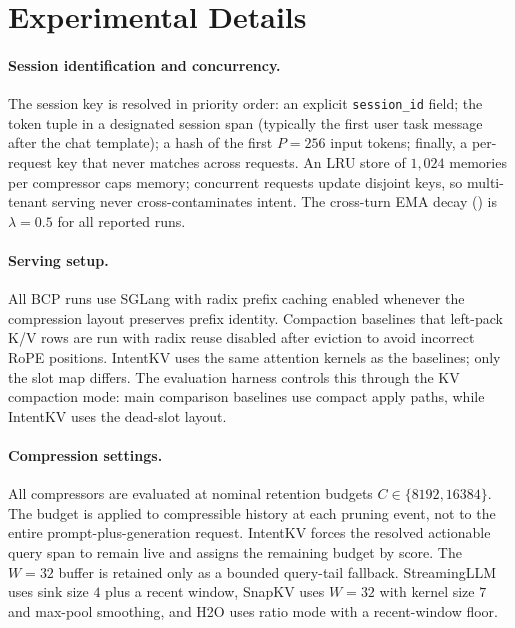 \documentclass[11pt]{article}
\newcommand{\method}{IntentKV\xspace}
\begin{document}


\appendix

\section{Experimental Details}
\label{appendix:hyperparams}

\paragraph{Session identification and concurrency.}
The session key is resolved in priority order: an explicit
\texttt{session\_id} field; the token tuple in a designated session
span (typically the first user task message after the chat
template); a hash of the first $P\!=\!256$ input tokens; finally, a
per-request key that never matches across requests. An LRU store of
$1{,}024$ memories per compressor caps memory; concurrent requests
update disjoint keys, so multi-tenant serving never
cross-contaminates intent. The cross-turn EMA decay
() is $\lambda{=}0.5$ for all reported runs.

\paragraph{Serving setup.}
All BCP runs use SGLang with radix prefix caching enabled whenever the
compression layout preserves prefix identity. Compaction baselines that
left-pack K/V rows are run with radix reuse disabled after eviction to
avoid incorrect RoPE positions. \method uses the same attention kernels
as the baselines; only the slot map differs. The evaluation harness
controls this through the KV compaction mode: main comparison baselines
use compact apply paths, while \method uses the dead-slot layout.

\paragraph{Compression settings.}
All compressors are evaluated at nominal retention budgets
$C\in\{8192,16384\}$. The budget is applied to compressible history at
each pruning event, not to the entire prompt-plus-generation request.
\method forces the resolved actionable query span to remain live and
assigns the remaining budget by score. The $W{=}32$ buffer is retained
only as a bounded query-tail fallback. StreamingLLM uses sink size $4$
plus a recent window, SnapKV uses $W{=}32$ with kernel size $7$ and
max-pool smoothing, and H2O uses ratio mode with a recent-window floor.
\end{document}

